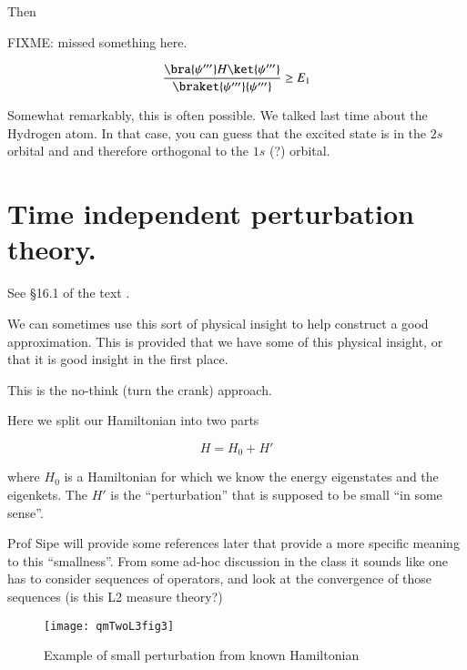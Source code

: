 
Then

FIXME: missed something here.

\begin{equation}\label{eqn:qmTwoL3:290}
\frac{
\bra{\psi'''} H \ket{\psi'''}
}
{
\braket{\psi'''}{\psi'''}
} 
\ge E_1
\end{equation}

Somewhat remarkably, this is often possible.  We talked last time about the Hydrogen atom.  In that case, you can guess that the excited state is in the $2s$ orbital and and therefore orthogonal to the $1s$ (?) orbital.  

\section{Time independent perturbation theory.}

See \S 16.1 of the text \cite{desai2009quantum}.

We can sometimes use this sort of physical insight to help construct a good approximation.  This is provided that we have some of this physical insight, or that it is good insight in the first place.

This is the no-think (turn the crank) approach.

Here we split our Hamiltonian into two parts

\begin{equation}\label{eqn:qmTwoL3:310}
H = H_0 + H'
\end{equation}

where $H_0$ is a Hamiltonian for which we know the energy eigenstates and the eigenkets.  The $H'$ is the ``perturbation'' that is supposed to be small ``in some sense''.

Prof Sipe will provide some references later that provide a more specific meaning to this ``smallness''.  From some ad-hoc discussion in the class it sounds like one has to consider sequences of operators, and look at the convergence of those sequences (is this L2 measure theory?)

\begin{figure}[htp]
\centering
\texttt{[image: qmTwoL3fig3]}
\caption{Example of small perturbation from known Hamiltonian}\label{fig:qmTwoL3fig3}
\end{figure}

